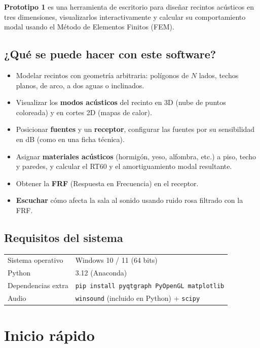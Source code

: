 \documentclass[11pt, a4paper]{article}
\begin{document}
\textbf{Prototipo 1} es una herramienta de escritorio para diseñar recintos
acústicos en tres dimensiones, visualizarlos interactivamente y calcular su
comportamiento modal usando el Método de Elementos Finitos (FEM).

\subsection*{¿Qué se puede hacer con este software?}

\begin{itemize}[itemsep=3pt]
  \item Modelar recintos con geometría arbitraria: polígonos de $N$ lados,
        techos planos, de arco, a dos aguas o inclinados.
  \item Visualizar los \textbf{modos acústicos} del recinto en 3D (nube de
        puntos coloreada) y en cortes 2D (mapas de calor).
  \item Posicionar \textbf{fuentes} y un \textbf{receptor}, configurar las
        fuentes por su sensibilidad en dB (como en una ficha técnica).
  \item Asignar \textbf{materiales acústicos} (hormigón, yeso, alfombra, etc.)
        a piso, techo y paredes, y calcular el RT60 y el amortiguamiento modal
        resultante.
  \item Obtener la \textbf{FRF} (Respuesta en Frecuencia) en el receptor.
  \item \textbf{Escuchar} cómo afecta la sala al sonido usando ruido rosa
        filtrado con la FRF.
\end{itemize}

\subsection*{Requisitos del sistema}

\begin{tabular}{ll}
  \toprule
  Sistema operativo  & Windows 10 / 11 (64 bits) \\
  Python             & 3.12 (Anaconda) \\
  Dependencias extra & \texttt{pip install pyqtgraph PyOpenGL matplotlib} \\
  Audio              & \texttt{winsound} (incluido en Python) + \texttt{scipy} \\
  \bottomrule
\end{tabular}

\section{Inicio rápido}
\end{document}
